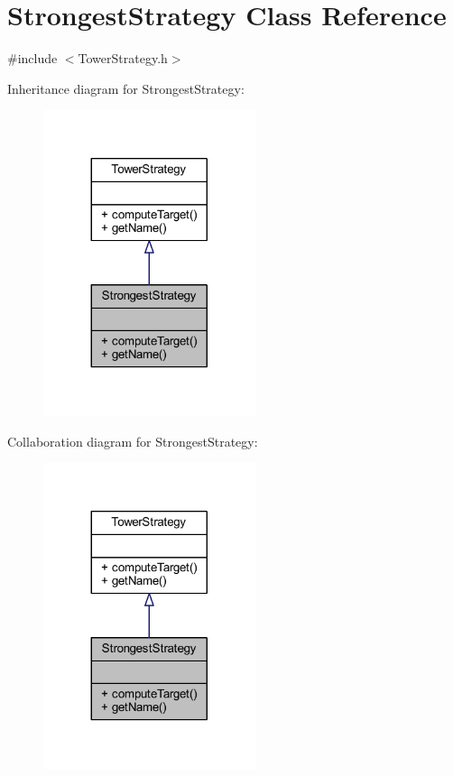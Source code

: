 \hypertarget{class_strongest_strategy}{\section{Strongest\+Strategy Class Reference}
\label{class_strongest_strategy}
}


{\ttfamily \#include $<$Tower\+Strategy.\+h$>$}



Inheritance diagram for Strongest\+Strategy\+:\nopagebreak
\begin{figure}[H]
\begin{center}
\leavevmode
\includegraphics[width=176pt]{class_strongest_strategy__inherit__graph}
\end{center}
\end{figure}


Collaboration diagram for Strongest\+Strategy\+:\nopagebreak
\begin{figure}[H]
\begin{center}
\leavevmode
\includegraphics[width=176pt]{class_strongest_strategy__coll__graph}
\end{center}
\end{figure}
